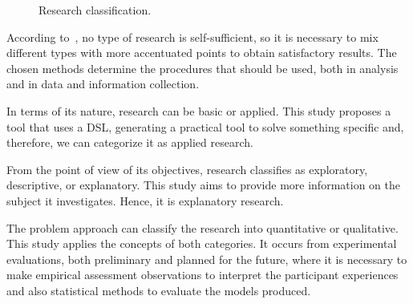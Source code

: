 \begin{figure}[!htb]
    \centering
    \caption{Research classification.}
    
    \label{fig:ResearchClassification}
\end{figure}

According to~\cite{Prodanov:2013}, no type of research is self-sufficient, so it is necessary to mix different types with more accentuated points to obtain satisfactory results.
The chosen methods determine the procedures that should be used, both in analysis and in data and information collection.

In terms of its nature, research can be basic or applied.
This study proposes a tool that uses a DSL, generating a practical tool to solve something specific and, therefore, we can categorize it as applied research.

From the point of view of its objectives, research classifies as exploratory, descriptive, or explanatory. 
This study aims to provide more information on the subject it investigates. Hence, it is explanatory research.

The problem approach can classify the research into quantitative or qualitative.
This study applies the concepts of both categories.
It occurs from experimental evaluations, both preliminary and planned for the future, where it is necessary to make empirical assessment observations to interpret the participant experiences and also statistical methods to evaluate the models produced.

